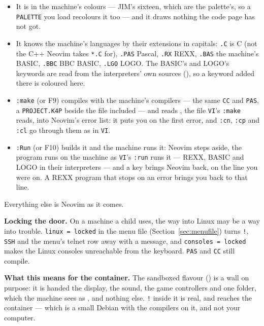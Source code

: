 \begin{itemize}[leftmargin=1.4em]
\item It is in the machine's colours --- JIM's sixteen, which are the
  palette's, so a \verb|PALETTE| you load recolours it too --- and it
  draws nothing the code page has not got.
\item It knows the machine's languages by their extensions in capitals:
  \texttt{.C} is C (not the C++ Neovim takes \texttt{*.C} for),
  \texttt{.PAS} Pascal, \texttt{.RX} REXX, \texttt{.BAS} the machine's
  BASIC, \texttt{.BBC} BBC BASIC, \texttt{.LGO} LOGO. The BASIC's and
  LOGO's keywords are read from the interpreters' own sources
  (), so a keyword added there is coloured here.
\item \verb|:make| (or F9) compiles with the machine's compilers --- the
  same \verb|CC| and \verb|PAS|, a \texttt{PROJECT.K4P} beside the file
  included --- and reads , the file
  \verb|VI|'s \verb|:make| reads, into Neovim's error list: it puts you on
  the first error, and \verb|:cn|, \verb|:cp| and \verb|:cl| go through
  them as in \verb|VI|.
\item \verb|:Run| (or F10) builds it and the machine runs it: Neovim
  steps aside, the program runs on the machine as \verb|VI|'s \verb|:run|
  runs it --- REXX, BASIC and LOGO in their interpreters --- and a key
  brings Neovim back, on the line you were on. A REXX program that stops
  on an error brings you back to that line.
\end{itemize}

\noindent Everything else is Neovim as it comes.

\begin{aside}
\textbf{Locking the door.} On a machine a child uses, the way into Linux
may be a way into trouble. \verb|linux = locked| in the menu file
(Section~\ref{sec:menufile}) turns \verb|!|, \verb|SSH| and the menu's
telnet row away with a message, and \verb|consoles = locked| makes the
Linux consoles unreachable from the keyboard. \verb|PAS| and \verb|CC|
still compile.
\end{aside}

\begin{aside}
\textbf{What this means for the container.} The sandboxed flavour
() is a wall on purpose: it is handed the display,
the sound, the game controllers and one folder, which the machine sees
as , and nothing else. \verb|!| inside it is real, and
reaches the container --- which is a small Debian with the compilers on
it, and not your computer.
\end{aside}

